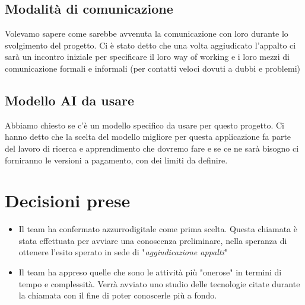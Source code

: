 \documentclass[italian, 12pt]{article}
\begin{document}
\subsection{Modalità di comunicazione}
Volevamo sapere come sarebbe avvenuta la comunicazione con loro durante lo svolgimento del progetto. Ci è stato detto che una volta aggiudicato l'appalto ci sarà un incontro iniziale per specificare il loro way of working e i loro mezzi di comunicazione formali e informali (per contatti veloci dovuti a dubbi e problemi)

\subsection{Modello AI da usare}
Abbiamo chiesto se c'è un modello specifico da usare per questo progetto. Ci hanno detto che la scelta del modello migliore per questa applicazione fa parte del lavoro di ricerca e apprendimento che dovremo fare e se ce ne sarà bisogno ci forniranno le versioni a pagamento, con dei limiti da definire.

\section{Decisioni prese}
\begin{itemize}
    \item Il team ha confermato azzurrodigitale come prima scelta. Questa chiamata è stata effettuata per avviare una conoscenza preliminare, nella speranza di ottenere l'esito sperato in sede di "\textit{aggiudicazione appalti}"
    \item Il team ha appreso quelle che sono le attività più "onerose" in termini di tempo e complessità. Verrà avviato uno studio delle tecnologie citate durante la chiamata con il fine di poter conoscerle più a fondo.
\end{itemize}
\end{document}
